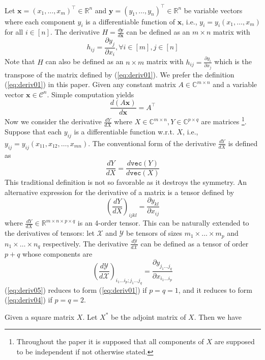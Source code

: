 \documentclass[11pt, oneside]{article}  %
\newcommand{\partl}{\partial}
\newcommand{\vecc}{\texttt{vec}}
\newcommand{\bbC}{\mathbb{C}}
\newcommand{\RR}{\mathbb{R}}
\newcommand{\C}{\mathcal{C}}
\newcommand{\X}{\mathcal{X}}
\newcommand{\Y}{\mathcal{Y}}
\newcommand{\bx}{\textbf{x}}
\newcommand{\by}{\textbf{y}}
\newcommand{\beq}{\begin{equation}}
\newcommand{\eeq}{\end{equation}}
\begin{document}
Let $\bx=(x_{1},\ldots,x_{m})^{\top}\in\RR^{n}$ and $\by=(y_{1},\ldots,y_{n})^{\top}\in\RR^{n}$ be variable vectors where each component $y_{i}$ is a differentiable function of $\bx$, i.e., $y_{i}=y_{i}(x_{1},\ldots,x_{m})$ for all $i\in [n]$. The derivative $H=\frac{d\by}{d\bx}$ can be defined as an $m\times n$ matrix with
\beq\label{eq:deriv01}
h_{ij} = \frac{\partl y_{j}}{\partl x_{i}}, \forall i\in [m], j\in [n] 
\eeq
Note that $H$ can also be defined as an $n\times m$ matrix with $h_{ij}=\frac{\partl y_{i}}{\partl x_{j}}$ which is the transpose of the matrix 
defined by (\ref{eq:deriv01}). We prefer the definition (\ref{eq:deriv01}) in this paper. Given any constant matrix $A\in\bbC^{m\times n}$ and a 
variable vector $\bx\in\C^{n}$.  Simple computation yields 
\beq\label{eq:deriv02}
\frac{d(A\bx)}{d\bx} = A^{\top}
\eeq
Now we consider the derivative $\frac{dY}{dX}$ where $X\in\bbC^{m\times n}, Y\in\bbC^{p\times q}$ are matrices 
\footnote{Throughout the paper it is supposed that all components of $X$ are supposed to be independent if not otherwise stated.}.  Suppose that each $y_{ij}$ is a differentiable function 
w.r.t. $X$, i.e., $y_{ij}=y_{ij}(x_{11},x_{12},\ldots, x_{mn})$.  The conventional form of the 
derivative $\frac{dY}{dX}$ is defined as 
\beq\label{eq:deriv03}
\frac{dY}{dX} = \frac{d\vecc(Y)}{d\vecc(X)}
\eeq
This traditional definition is not so favorable as it destroys the symmetry.  An alternative expression for the derivative of a matrix is a tensor defined by   
\beq\label{eq:deriv04}
\left(\frac{dY}{dX}\right)_{ijkl} = \frac{\partl y_{kl}}{\partl x_{ij}}
\eeq
where $\frac{dY}{dX}\in\RR^{m\times n\times p\times q}$ is an 4-order tensor. This can be naturally extended to the derivatives of tensors:  let $\X$ 
and $\Y$ be tensors of sizes $m_{1}\times\ldots\times m_{p}$ and $n_{1}\times\ldots\times n_{q}$ respectively.  The derivative $\frac{d\Y}{d\X}$ 
can be defined as a tensor of order $p+q$ whose components are 
\beq\label{eq:deriv05}
\left(\frac{d\Y}{d\X}\right)_{i_{1}\ldots i_{p};j_{1}\ldots j_{q}} = \frac{\partl y_{j_{1}\ldots j_{q}}}{\partl x_{i_{1}\ldots i_{p}}}
\eeq
(\ref{eq:deriv05}) reduces to form (\ref{eq:deriv01}) if $p=q=1$, and it reduces to form (\ref{eq:deriv04}) if $p=q=2$. \par 
\indent Given a square matrix $X$.  Let $X^{\ast}$ be the adjoint matrix of $X$.  Then we have  
\end{document}
